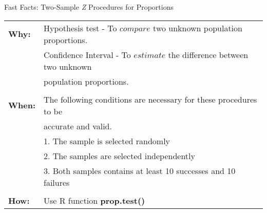 \documentclass[12pt,ignorenonframetext,aspectratio=169]{beamer}
\begin{document}
\begin{frame}{Fast Facts: Two-Sample \emph{Z} Procedures for
Proportions}

\begin{table}
        \centering
        \begin{tabular}{ll}
        \bf{Why}: & Hypothesis test - To $compare$ two unknown population proportions. \\
                  & Confidence Interval - To $estimate$ the difference between two unknown \\
                  & population proportions. \\
                  &  \\
        \bf{When}: & The following conditions are necessary for these procedures to be \\
                  & accurate and valid.   \\
                  & \hspace{1em} 1. The sample is selected randomly \\
                  & \hspace{1em} 2. The samples are selected independently  \\
                  & \hspace{1em} 3. Both samples contains at least 10 successes and 10 failures  \\

                  &  \\
        \bf{How}: & Use R function \bf{prop.test()}  \\
        \end{tabular}
\end{table}


\end{frame}
\end{document}

